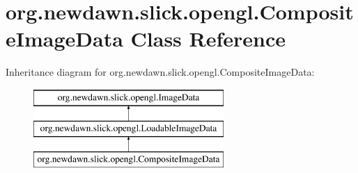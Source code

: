 \hypertarget{classorg_1_1newdawn_1_1slick_1_1opengl_1_1_composite_image_data}{}\section{org.\+newdawn.\+slick.\+opengl.\+Composite\+Image\+Data Class Reference}
\label{classorg_1_1newdawn_1_1slick_1_1opengl_1_1_composite_image_data}
Inheritance diagram for org.\+newdawn.\+slick.\+opengl.\+Composite\+Image\+Data\+:\begin{figure}[H]
\begin{center}
\leavevmode
\includegraphics[height=3.000000cm]{classorg_1_1newdawn_1_1slick_1_1opengl_1_1_composite_image_data}
\end{center}
\end{figure}
